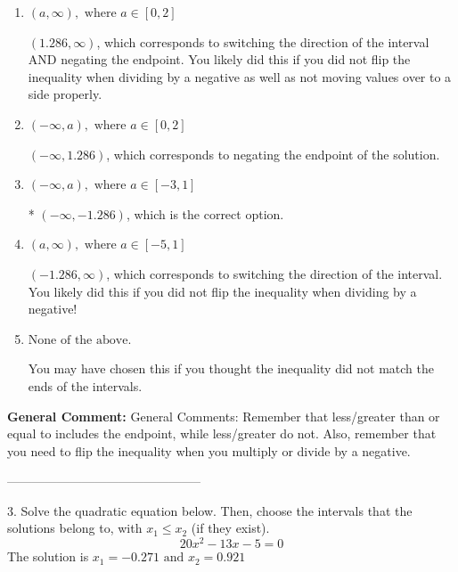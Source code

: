 \documentclass{extbook}[14pt]
\begin{document}
\begin{enumerate}[label=\Alph*.] 
\item $ (a, \infty), \text{ where } a \in [0, 2] $ 

  $(1.286, \infty)$, which corresponds to switching the direction of the interval AND negating the endpoint. You likely did this if you did not flip the inequality when dividing by a negative as well as not moving values over to a side properly. 
\item $ (-\infty, a), \text{ where } a \in [0, 2] $ 

  $(-\infty, 1.286)$, which corresponds to negating the endpoint of the solution. 
\item $ (-\infty, a), \text{ where } a \in [-3, 1] $ 

 * $(-\infty, -1.286)$, which is the correct option. 
\item $ (a, \infty), \text{ where } a \in [-5, 1] $ 

  $(-1.286, \infty)$, which corresponds to switching the direction of the interval. You likely did this if you did not flip the inequality when dividing by a negative! 
\item $ \text{None of the above}. $ 

 You may have chosen this if you thought the inequality did not match the ends of the intervals. 
\end{enumerate} 
 
\textbf{General Comment:} General Comments: Remember that less/greater than or equal to includes the endpoint, while less/greater do not. Also, remember that you need to flip the inequality when you multiply or divide by a negative. 

-----------------------------------------------

3. Solve the quadratic equation below. Then, choose the intervals that the solutions belong to, with $x_1 \leq x_2$ (if they exist).
\[ 20x^{2} -13 x -5 = 0 \] 
The solution is $ x_1 = -0.271 \text{ and } x_2 = 0.921 $ 
\end{document}
